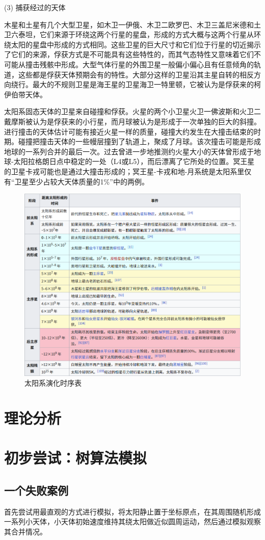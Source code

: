 \documentclass[hidelinks]{article}
\begin{document}
    (3) 捕获经过的天体
    
木星和土星有几个大型卫星，如木卫一伊俄、木卫二欧罗巴、木卫三盖尼米德和土卫六泰坦，它们来源于环绕这两个行星的星盘，形成的方式大概与这两个行星从环绕太阳的星盘中形成的方式相同。这些卫星的巨大尺寸和它们位于行星的切近揭示了它们的来源，俘获方式是不可能具有这些特性的，而其气态特性又意味着它们不可能从撞击残骸中形成。大型气体行星的外围卫星一般偏小偏心且有任意倾角的轨道，这些都是俘获天体预期会有的特性。大部分这样的卫星沿其主星自转的相反方向绕行。最大的不规则卫星是海王星的卫星海卫一特里顿，它被认为是俘获来的柯伊伯带天体。

太阳系固态天体的卫星来自碰撞和俘获。火星的两个小卫星火卫一佛波斯和火卫二戴摩斯被认为是俘获来的小行星，而月球被认为是形成于一次单独的巨大的斜撞。进行撞击的天体估计可能有接近火星一样的质量，碰撞大约发生在大撞击结束的时期。碰撞把撞击天体的一些幔层撞到了轨道上，聚成了月球。该次撞击可能是形成地球的一系列合并的最后一次。过去曾进一步地推测约火星大小的天体曾形成于地球-太阳拉格朗日点中稳定的一处（L4或L5），而后漂离了它所处的位置。冥王星的卫星卡戎可能也是通过大撞击形成的；冥王星-卡戎和地-月系统是太阳系里仅有“卫星至少占较大天体质量的1\%”中的两例。
\begin{figure}
    \centering
    \includegraphics[width=0.5\linewidth]{images/time_list.png}
    \caption{太阳系演化时序表}
    \label{fig:enter-label}
\end{figure}
\section{理论分析}

\section{初步尝试：树算法模拟}
\subsection{一个失败案例}
首先尝试用最直观的方式进行模拟，将太阳静止置于坐标原点，在其周围随机形成一系列小天体，小天体初始速度维持其绕太阳做近似圆周运动，然后通过模拟观察其合并情况。\\
\end{document}
